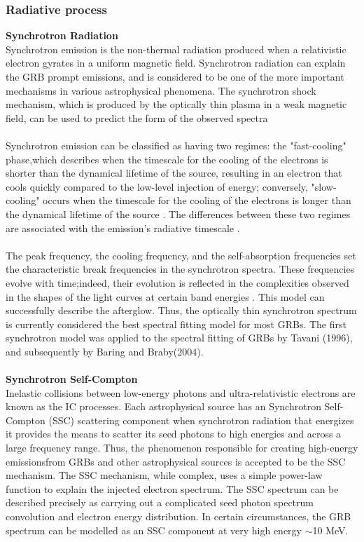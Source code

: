 \subsubsection{Radiative process}
\textbf{ Synchrotron Radiation}\\
Synchrotron emission is the non-thermal radiation produced when a relativistic
electron gyrates in a uniform magnetic field. Synchrotron radiation can explain
the GRB prompt emissions, and is considered to be one of the more important
mechanisms in various astrophysical phenomena. The synchrotron shock mechanism,
which is produced by the optically thin plasma in a weak magnetic field, can be
used to predict the form of the observed spectra \citep{1}\citep{15}\citep{18}\\\\
Synchrotron emission can be classified as having two regimes: the "fast-cooling"
phase,which describes when the timescale for the cooling of the electrons is shorter
than the dynamical lifetime of the source, resulting in an electron that cools quickly compared to the low-level injection of energy; conversely, "slow-cooling" occurs when the timescale for the cooling of the electrons is longer than the dynamical lifetime of the source . The differences between these two regimes are associated with the emission’s radiative timescale \citep{9} \citep{10}.\\\\
The peak frequency, the cooling frequency, and the self-absorption frequencies set
the characteristic break frequencies in the synchrotron spectra. These frequencies
evolve with time;indeed, their evolution is reflected in the complexities observed in
the shapes of the light curves at certain band energies . This model can successfully
describe the afterglow. Thus, the optically thin synchrotron spectrum is currently
considered the best spectral fitting model for most GRBs. The first synchrotron
model was applied to the spectral fitting of GRBs by Tavani (1996), and subsequently
by Baring and Braby(2004)\citep{15}\citep{16}.\\\\
\textbf{Synchrotron Self-Compton}\\
Inelastic collisions between low-energy photons and ultra-relativistic electrons are
known as the IC processes. Each astrophysical source has an Synchrotron Self-
Compton (SSC) scattering component when synchrotron radiation that energizes
it provides the means to scatter its seed photons to high energies and across a large
frequency range. Thus, the phenomenon responsible for creating high-energy emissionsfrom GRBs and other astrophysical sources is accepted to be the SSC mechanism. The SSC mechanism, while complex, uses a simple power-law function to explain the injected electron spectrum. The SSC spectrum can be described precisely as carrying out a complicated seed photon spectrum convolution and electron energy distribution. In certain circumstances, the GRB spectrum can be modelled as an SSC component at very high energy $ \sim $10 MeV.\citep{11}\citep{16} 
